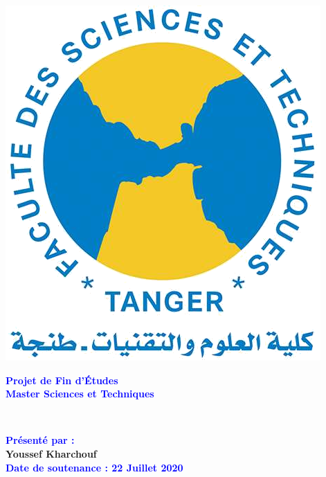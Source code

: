\begin{titlepage}
\begin{minipage}{0.5\textwidth}
\end{minipage}
\hfill
\begin{minipage}{0.17\textwidth}
  \includegraphics[width=\linewidth]{resources/fstt.png}
\end{minipage}

\vspace*{1.5cm}

\centering

\textbf{\textcolor{blue}{Projet de Fin d’Études}}\\[0.3cm]
\textbf{\textcolor{blue}{Master Sciences et Techniques}}\\[0.5cm]
\colorbox{gray!50}{\strut{}}\\[2cm]


\vspace{1cm}
\begin{center}
\textbf{\textcolor{blue}{Présenté par :}}\\[0.5cm]
\textbf{Youssef Kharchouf}\\[0.5cm]
\textbf{\textcolor{blue}{Date de soutenance : 22 Juillet 2020}}
\end{center}
  

\end{titlepage}
